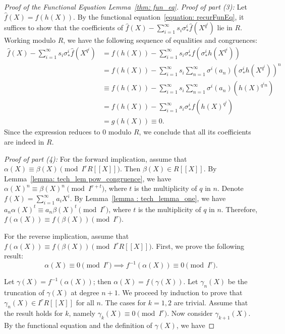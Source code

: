 \begin{proof}[Proof of the Functional Equation Lemma~\ref{thm: fun_eq}]
\textit{Proof of part (3):} Let $\hat{f}(X) = f(h(X))$. By the functional equation~\eqref{equation: recurFunEq}, it suffices to show that the coefficients of $\hat{f}(X) - \sum_{i=1}^\infty s_i \sigma_*^i \hat{f}(X^{q^i})$ lie in $R$. Working modulo $R$, we have the following sequence of equalities and congruences:
\[\begin{aligned}
    \hat{f}(X) - \sum_{i=1}^\infty s_i \sigma_*^i\hat{f}(X^{q^i}) &= f(h(X)) - \sum_{i=1}^\infty s_i \sigma_*^i f(\sigma_*^i h(X^{q^i})) \\
    &= f(h(X)) - \sum_{i=1}^\infty s_i \sum_{n=1}^\infty \sigma^i(a_n)(\sigma_*^i h(X^{q^i}))^n \\
    &\equiv f(h(X)) - \sum_{i=1}^\infty s_i \sum_{n=1}^\infty \sigma^i(a_n)(h(X)^{q^i n}) \\
    &= f(h(X)) - \sum_{i=1}^\infty s_i \sigma_*^i f(h(X)^{q^i}) \\
    &= g(h(X)) \equiv 0.
\end{aligned} \]
Since the expression reduces to $0$ modulo $R$, we conclude that all its coefficients are indeed in $R$.

\textit{Proof of part (4):}
For the forward implication, assume that $\alpha(X) \equiv \beta(X) \pmod{I^r R[\![X]\!]}$.
Then $\beta(X) \in R[\![X]\!]$. By Lemma~\ref{lemma: tech_lem pow_congruence},
we have $\alpha(X)^n \equiv \beta(X)^n \pmod{I^{r + t}}$, where $t$ is the multiplicity of
$q$ in $n$. Denote $f(X) = \sum_{i=1}^\infty a_i X^i$. By Lemma~\ref{lemma : tech_lemma_one},
we have $a_n\alpha(X)^t \equiv a_n\beta(X)^t \pmod{I^r}$, where $t$ is the multiplicity of
$q$ in $n$. Therefore, $f(\alpha(X)) \equiv f(\beta(X)) \pmod{I^r}$.

For the reverse implication, assume that $f(\alpha(X)) \equiv f(\beta(X)) \pmod{I^r R[\![X]\!]}$.
First, we prove the following result:
\begin{equation}
    \alpha(X) \equiv 0 \pmod{I^r} \implies f^{-1}(\alpha(X)) \equiv 0 \pmod{I^r}.
    \label{eq: implication_f_inv}
\end{equation}

Let $\gamma(X) = f^{-1}(\alpha(X))$; then $\alpha(X) = f(\gamma(X))$. Let $\gamma_n(X)$ be
the truncation of $\gamma(X)$ at degree $n + 1$. We proceed by induction to prove that
$\gamma_n(X) \in I^r R[\![X]\!]$ for all $n$. The cases for $k = 1, 2$ are trivial.
Assume that the result holds for $k$, namely $\gamma_k(X) \equiv 0 \pmod{I^r}$.
Now consider $\gamma_{k+1}(X)$. By the functional equation and the definition of $\gamma(X)$,
we have


\end{proof}
